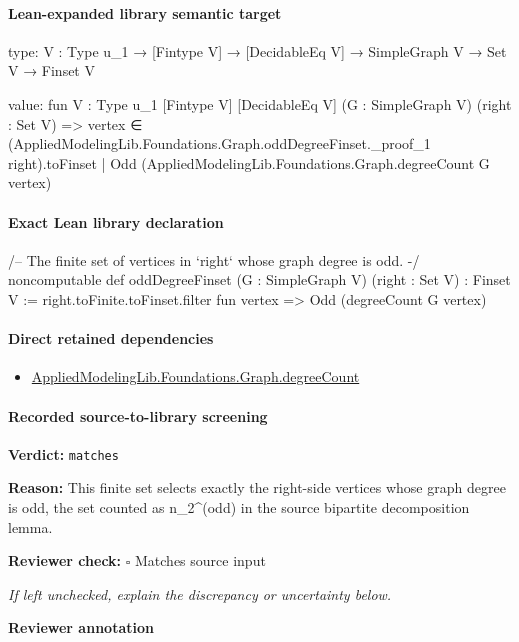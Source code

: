 \documentclass[10pt]{article}
\newcommand{\reviewerbox}{%
  \par\noindent\fbox{\parbox{0.96\linewidth}{\rule{0pt}{0.38in}}}\par
}
\newcommand{\reviewmatch}[1]{%
  \par\noindent\textbf{Reviewer check:} $\square$\; #1\par
  \noindent\emph{If left unchecked, explain the discrepancy or uncertainty below.}\par
}
\begin{document}
\paragraph{Lean-expanded library semantic target}
\begin{ReviewVerbatim}
type:
{V : Type u_1} → [Fintype V] → [DecidableEq V] → SimpleGraph V → Set V → Finset V

value:
fun {V : Type u_1} [Fintype V] [DecidableEq V] (G : SimpleGraph V) (right : Set V) =>
  {vertex ∈ (AppliedModelingLib.Foundations.Graph.oddDegreeFinset._proof_1 right).toFinset |
    Odd (AppliedModelingLib.Foundations.Graph.degreeCount G vertex)}
\end{ReviewVerbatim}

\paragraph{Exact Lean library declaration}
\begin{ReviewVerbatim}
/-- The finite set of vertices in `right` whose graph degree is odd. -/
noncomputable def oddDegreeFinset (G : SimpleGraph V) (right : Set V) : Finset V :=
  right.toFinite.toFinset.filter fun vertex => Odd (degreeCount G vertex)
\end{ReviewVerbatim}

\paragraph{Direct retained dependencies}
\begin{itemize}\raggedright
\item \hyperlink{library-prerequisite-44e965e1fe85fa7e}{Applied\allowbreak{}Modeling\allowbreak{}Lib.\allowbreak{}Foundations.\allowbreak{}Graph.\allowbreak{}degree\allowbreak{}Count}
\end{itemize}
\paragraph{Recorded source-to-library screening}
\textbf{Verdict:} \texttt{matches}
\\
{\raggedright
\textbf{Reason:} This finite set selects exactly the right-\allowbreak{}side vertices whose graph degree is odd, the set counted as n\_\allowbreak{}2\textasciicircum{}(odd) in the source bipartite decomposition lemma.\allowbreak{}
\par}
\reviewmatch{Matches source input}
\noindent\textbf{Reviewer annotation}\par
\reviewerbox
\clearpage
\hypertarget{library-prerequisite-71d63b415ae0befc}{}
\end{document}
